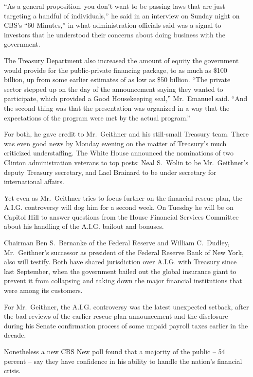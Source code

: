 \documentclass[12pt,a4paper,onecolumn]{article}
\begin{document}
\begin{CJK*}{GBK}{song}
``As a general proposition, you don't want to be passing laws that are just targeting a handful of
individuals,'' he said in an interview on Sunday night on CBS's ``60 Minutes,'' in what
administration officials said was a signal to investors that he understood their concerns about
doing business with the government.

The Treasury Department also increased the amount of equity the government would provide for the
public-private financing package, to as much as \$100 billion, up from some earlier estimates of as
low as \$50 billion. ``The private sector stepped up on the day of the announcement saying they
wanted to participate, which provided a Good Housekeeping seal,'' Mr.~Emanuel said. ``And the second
thing was that the presentation was organized in a way that the expectations of the program were met
by the actual program.''

For both, he gave credit to Mr.~Geithner and his still-small Treasury team. There was even good news
by Monday evening on the matter of Treasury's much criticized understaffing. The White House
announced the nominations of two Clinton administration veterans to top posts: Neal S.~Wolin to be
Mr.~Geithner's deputy Treasury secretary, and Lael Brainard to be under secretary for international
affairs.

Yet even as Mr.~Geithner tries to focus further on the financial rescue plan, the A.I.G. controversy
will dog him for a second week. On Tuesday he will be on Capitol Hill to answer questions from the
House Financial Services Committee about his handling of the A.I.G. bailout and bonuses.

Chairman Ben S.~Bernanke of the Federal Reserve and William C.~Dudley, Mr.~Geithner's successor as
president of the Federal Reserve Bank of New York, also will testify. Both have shared jurisdiction
over A.I.G. with Treasury since last September, when the government bailed out the global insurance
giant to prevent it from collapsing and taking down the major financial institutions that were among
its customers.

For Mr.~Geithner, the A.I.G. controversy was the latest unexpected setback, after the bad reviews of
the earlier rescue plan announcement and the disclosure during his Senate confirmation process of
some unpaid payroll taxes earlier in the decade.

Nonetheless a new CBS New poll found that a majority of the public -- 54 percent -- say they have
confidence in his ability to handle the nation's financial crisis.


\end{CJK*}
\end{document}
